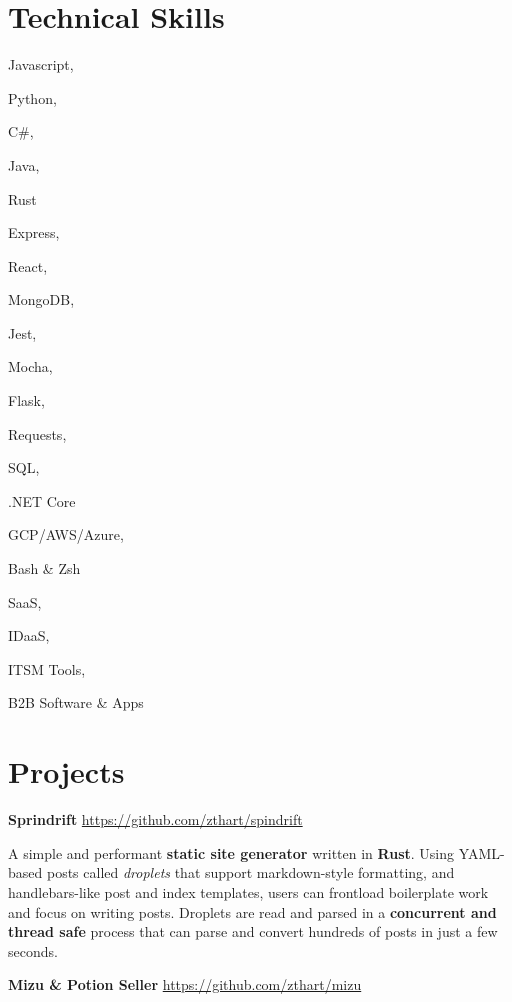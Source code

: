 \documentclass[margin,line]{resume}
\newcommand{\rurl}[1]{\hfill {\footnotesize \url{#1}}}
\begin{document}
\begin{resume}
\section{\mysidestyle Technical Skills}
	\begin{compactdesc}
		\item[Languages] \begin{inparablank} { \small
			\item Javascript,
			\item Python,
			\item C\#,
			\item Java,
			\item Rust
		} \end{inparablank}
        \item[Frameworks, Libraries, \& Tools] \begin{inparablank} { \small
			\item Express,
			\item React,
			\item MongoDB,
			\item Jest,
			\item Mocha,
			\item Flask, 
			\item Requests, 
			\item SQL,
			\item .NET Core
			\item GCP/AWS/Azure,
			\item Bash \& Zsh
        } \end{inparablank}
		\item[Domain Experience] \begin{inparablank} { \small
			\item SaaS,
			\item IDaaS,
			\item ITSM Tools,
			\item B2B Software \& Apps
		} \end{inparablank}
        \normalsize
	\end{compactdesc}

\section{\mysidestyle Projects}
	\begin{asparablank}
		\item {\bf Sprindrift} \rurl{https://github.com/zthart/spindrift}

		\small A simple and performant \textbf{static site generator} written in \textbf{Rust}. 
		Using YAML-based posts called \textit{droplets} that support markdown-style formatting, and handlebars-like post and index templates, users can frontload boilerplate work and focus on writing posts.
		Droplets are read and parsed in a \textbf{concurrent and thread safe} process that can parse and convert hundreds of posts in just a few seconds.
		\normalsize
		\\
        \item {\bf Mizu \& Potion Seller } \rurl{https://github.com/zthart/mizu}


\end{asparablank}
\end{resume}
\end{document}
